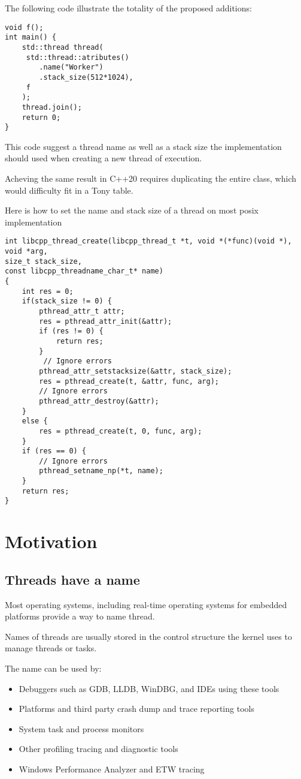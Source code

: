 \documentclass{wg21}
\begin{document}
The following code illustrate the totality of the proposed additions:

\begin{lstlisting}[style=MY]
void f();
int main() {
    std::thread thread(
     std::thread::atributes()
        .name("Worker")
        .stack_size(512*1024),
     f
    );
    thread.join();
    return 0;
}
\end{lstlisting}


This code suggest a thread name as well as a stack size 
the implementation should used when creating a new thread of execution.

Acheving the same result in C++20 requires duplicating the entire 
class, which would difficulty fit in a Tony table.

\pagebreak

Here is how to set the name and stack size of a thread on most posix implementation

\begin{lstlisting}[style=MYSMALL]
int libcpp_thread_create(libcpp_thread_t *t, void *(*func)(void *),
void *arg,
size_t stack_size,
const libcpp_threadname_char_t* name)
{
    int res = 0;
    if(stack_size != 0) {
        pthread_attr_t attr;
        res = pthread_attr_init(&attr);
        if (res != 0) {
            return res;
        }
         // Ignore errors
        pthread_attr_setstacksize(&attr, stack_size);
        res = pthread_create(t, &attr, func, arg);
        // Ignore errors
        pthread_attr_destroy(&attr);
    }
    else {
        res = pthread_create(t, 0, func, arg);
    }
    if (res == 0) {
        // Ignore errors
        pthread_setname_np(*t, name);
    }
    return res;
}
\end{lstlisting}
\section{Motivation}

\subsection{Threads have a name}

Most operating systems, including real-time operating systems for embedded platforms
provide a way to name thread.

Names of threads are usually stored in the control structure the kernel uses to manage threads or tasks.

The name can be used by:
\begin{itemize}
    \item Debuggers such as GDB, LLDB, WinDBG, and IDEs using these tools
    \item Platforms and third party crash dump and trace reporting tools
    \item System task and process monitors
    \item Other profiling tracing and diagnostic tools
    \item Windows Performance Analyzer and ETW tracing
\end{itemize} 
\end{document}
